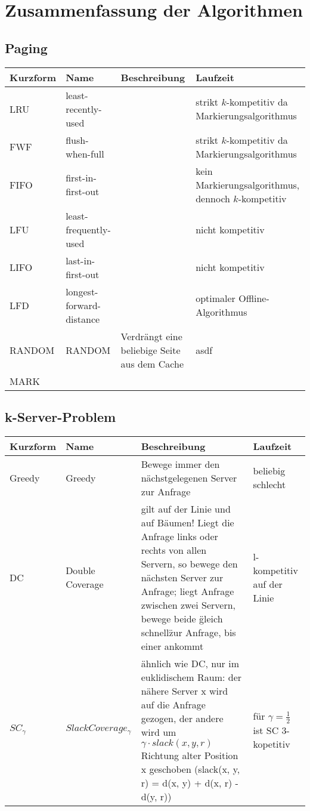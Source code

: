 \chapter{Zusammenfassung der Algorithmen}

\section{Paging}
\begin{tabularx}{\textwidth}{|l|X|X|X|} \hline
Kurzform & Name & Beschreibung & Laufzeit\\ \hline \hline
LRU  & least-recently-used      & & strikt $k$-kompetitiv da Markierungsalgorithmus \\ \hline
FWF  & flush-when-full          & & strikt $k$-kompetitiv da Markierungsalgorithmus \\ \hline
FIFO & first-in-first-out       & & kein Markierungsalgorithmus, dennoch $k$-kompetitiv \\ \hline
LFU  & least-frequently-used    & & nicht kompetitiv\\ \hline
LIFO & last-in-first-out        & & nicht kompetitiv\\ \hline
LFD  & longest-forward-distance & & optimaler Offline-Algorithmus \\ \hline
RANDOM & RANDOM & Verdrängt eine beliebige Seite aus dem Cache & asdf\\ \hline
MARK & & & \\ \hline
\end{tabularx}


\section{k-Server-Problem}
\begin{tabularx}{\textwidth}{|l|X|X|X|} \hline
Kurzform & Name & Beschreibung & Laufzeit\\ \hline \hline
Greedy  & Greedy & Bewege immer den nächstgelegenen Server zur Anfrage & beliebig schlecht \\ \hline
DC  & Double Coverage & gilt auf der Linie und auf Bäumen! Liegt die Anfrage links oder rechts von allen Servern, so bewege den nächsten Server zur Anfrage; liegt Anfrage zwischen zwei Servern, bewege beide \"gleich schnell\" zur Anfrage, bis einer ankommt& l-kompetitiv auf der Linie \\ \hline
 $SC_{\gamma}$ & $Slack Coverage_{\gamma}$ & ähnlich wie DC, nur im euklidischem Raum: der nähere Server x wird auf die Anfrage gezogen, der andere wird um $\gamma \cdot slack(x, y, r)$ Richtung alter Position x geschoben (slack(x, y, r) = d(x, y) + d(x, r) - d(y, r)) & für $\gamma = \tfrac{1}{2}$ ist SC 3-kopetitiv \\ \hline
\end{tabularx}